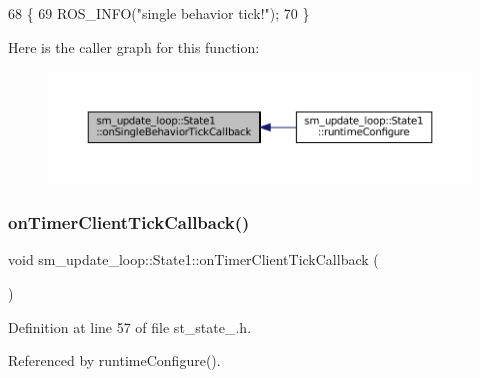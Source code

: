 \begin{DoxyCode}
68     \{
69         ROS\_INFO(\textcolor{stringliteral}{"single behavior tick!"});
70     \}
\end{DoxyCode}
Here is the caller graph for this function\+:
\nopagebreak
\begin{figure}[H]
\begin{center}
\leavevmode
\includegraphics[width=350pt]{structsm__update__loop_1_1State1_ad15fb64f4f918c423038180d434d7220_icgraph}
\end{center}
\end{figure}
\mbox{\label{structsm__update__loop_1_1State1_af132641f3167a2224249c70d072b6574}} 
\subsubsection{\texorpdfstring{on\+Timer\+Client\+Tick\+Callback()}{onTimerClientTickCallback()}}
{\footnotesize\ttfamily void sm\+\_\+update\+\_\+loop\+::\+State1\+::on\+Timer\+Client\+Tick\+Callback (\begin{DoxyParamCaption}{ }\end{DoxyParamCaption})\hspace{0.3cm}{\ttfamily [inline]}}



Definition at line 57 of file st\+\_\+state\+\_.\+h.



Referenced by runtime\+Configure().


